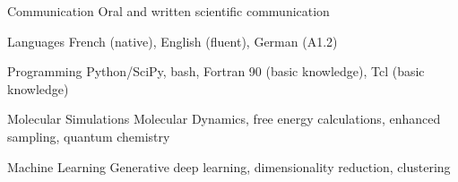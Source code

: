 
\begin{cvskills}

  \cvskill
  	{Communication}
  	{Oral and written scientific communication}

  \cvskill
    {Languages}
    {French (native), English (fluent), German (A1.2)}

  \cvskill
    {Programming}
    {Python/SciPy, bash, Fortran 90 (basic knowledge), Tcl (basic knowledge)}

  \cvskill
    {Molecular Simulations}
    {Molecular Dynamics, free energy calculations, enhanced sampling, quantum chemistry}

  \cvskill
    {Machine Learning}
    {Generative deep learning, dimensionality reduction, clustering}

\end{cvskills}
